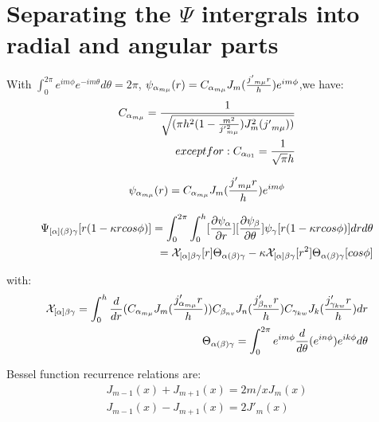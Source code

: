 \documentclass{Note}
\begin{document}
\section{Separating the $\Psi$ intergrals into radial and angular parts}

With $\int_0^{2\pi} e^{im\phi}e^{-im\theta}  d\theta=2\pi$,
$\psi_{\alpha_{m\mu}}(r)=C_{\alpha_{m\mu}}J_m({{j'}_{m\mu} r\over h})e^{im\phi}$,we have:
\begin{equation}
\begin{aligned}
C_{\alpha_{m\mu}}={1\over \sqrt{({{\pi h^2}(1-{m^2\over {j'}_{m\mu}^2} )}J^2_m({j'}_{m\mu}))}}\\
except for:
C_{\alpha_{01}}={1 \over \sqrt{\pi}h}
\end{aligned}
\end{equation}

\begin{equation}
\begin{aligned}
\psi_{\alpha_{m\mu}}(r)=C_{\alpha_{m\mu}}J_m({{j'}_{m\mu} r\over h})e^{im\phi}
\end{aligned}
\end{equation}



\begin{equation}
\begin{aligned}
\Psi_{[\alpha](\beta)\gamma}[r(1-\kappa r cos\phi)]=\int_0^{2\pi} \int_0^h [{\partial \psi_\alpha \over \partial r}][{\partial \psi_\beta \over \partial \theta}] \psi_\gamma [r(1-\kappa r cos\phi)] dr d\theta \\
=\mathcal{X}_{[\alpha]\beta\gamma}[r]\Theta_{\alpha(\beta)\gamma}-\kappa \mathcal{X}_{[\alpha]\beta\gamma}[r^2]\Theta_{\alpha(\beta)\gamma}[cos\phi]
\end{aligned}
\end{equation}

with:
\begin{equation}
\begin{aligned}
\mathcal{X}_{[\alpha]\beta\gamma}=\int_0^h {d\over dr}(C_{\alpha_{m\mu}} J_m({j'_{\alpha_{m\mu}}r\over h}))C_{\beta_{nv}} J_n({j'_{\beta_{nv}}r\over h})C_{\gamma_{kw}} J_k({j'_{\gamma_{kw}}r\over h})dr\\
\Theta_{\alpha(\beta)\gamma}=\int_0^{2\pi} e^{im\phi} {d\over d\theta} (e^{in\phi}) e^{ik\phi} d\theta
\end{aligned}
\end{equation}


Bessel function recurrence relations are:
\begin{equation}
\begin{aligned}
J_{m-1}(x)+J_{m+1}(x)=2m/x J_m(x)\\
J_{m-1}(x)-J_{m+1}(x)=2J'_m(x)
\end{aligned}
\end{equation}
\end{document}
